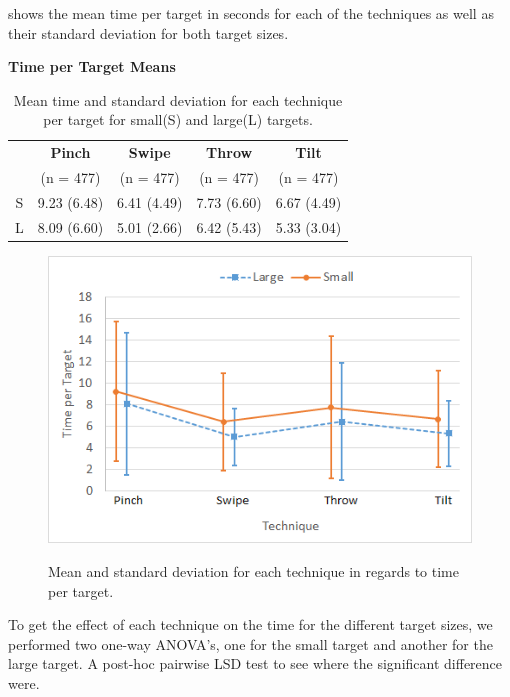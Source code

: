  shows the mean time per target in seconds for each of the techniques as well as their standard deviation for both target sizes. 
\begin{table}[H]
	\centering
	\textbf{Time per Target Means}\\[4pt]
	\begin{adjustbox}{width=\columnwidth}
	\begin{tabular}{|c|c|c|c|c|}
		\hline
		\rowcolor[HTML]{9B9B9B} 
		 & \textbf{Pinch} & \textbf{Swipe} & \textbf{Throw} & \textbf{Tilt} \\ 
		 \rowcolor[HTML]{9B9B9B} 
		 & (n = 477) & (n = 477) & (n = 477) & (n = 477) \\ \hline
		S & 9.23 (6.48)          & 6.41  (4.49)         & 7.73 (6.60)          & 6.67 (4.49)  \\ \hline
		L & 8.09 (6.60)          & 5.01  (2.66)          & 6.42 (5.43)          & 5.33 (3.04) \\ \hline
	\end{tabular}
	\end{adjustbox}
	\caption{Mean time and standard deviation for each technique per target for small(S) and large(L) targets.}
	\label{tab:meanTimesTechnique}
\end{table}

\begin{figure}[H]
	{\includegraphics[width = 1\columnwidth ]{images/time.png}} 
	\caption{
		Mean and standard deviation for each technique in regards to time per target.
	}
	\label{fig:timeResults}
\end{figure}

To get the effect of each technique on the time for the different target sizes, we performed two one-way ANOVA's, one for the small target and another for the large target.
A post-hoc pairwise LSD test to see where the significant difference were.

